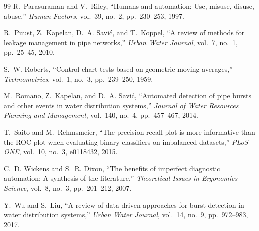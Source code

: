 \documentclass[11pt,a4paper]{article}
\begin{document}
\begin{thebibliography}{99}
 R.~Parasuraman and V.~Riley, ``Humans and automation: Use, misuse, disuse, abuse,'' \emph{Human Factors}, vol.~39, no.~2, pp.~230--253, 1997.

 R.~Puust, Z.~Kapelan, D.~A. Savi\'{c}, and T.~Koppel, ``A review of methods for leakage management in pipe networks,'' \emph{Urban Water Journal}, vol.~7, no.~1, pp.~25--45, 2010.

 S.~W. Roberts, ``Control chart tests based on geometric moving averages,'' \emph{Technometrics}, vol.~1, no.~3, pp.~239--250, 1959.

 M.~Romano, Z.~Kapelan, and D.~A. Savi\'{c}, ``Automated detection of pipe bursts and other events in water distribution systems,'' \emph{Journal of Water Resources Planning and Management}, vol.~140, no.~4, pp.~457--467, 2014.

 T.~Saito and M.~Rehmsmeier, ``The precision-recall plot is more informative than the ROC plot when evaluating binary classifiers on imbalanced datasets,'' \emph{PLoS ONE}, vol.~10, no.~3, e0118432, 2015.

 C.~D. Wickens and S.~R. Dixon, ``The benefits of imperfect diagnostic automation: A synthesis of the literature,'' \emph{Theoretical Issues in Ergonomics Science}, vol.~8, no.~3, pp.~201--212, 2007.

 Y.~Wu and S.~Liu, ``A review of data-driven approaches for burst detection in water distribution systems,'' \emph{Urban Water Journal}, vol.~14, no.~9, pp.~972--983, 2017.

\end{thebibliography}
\end{document}
